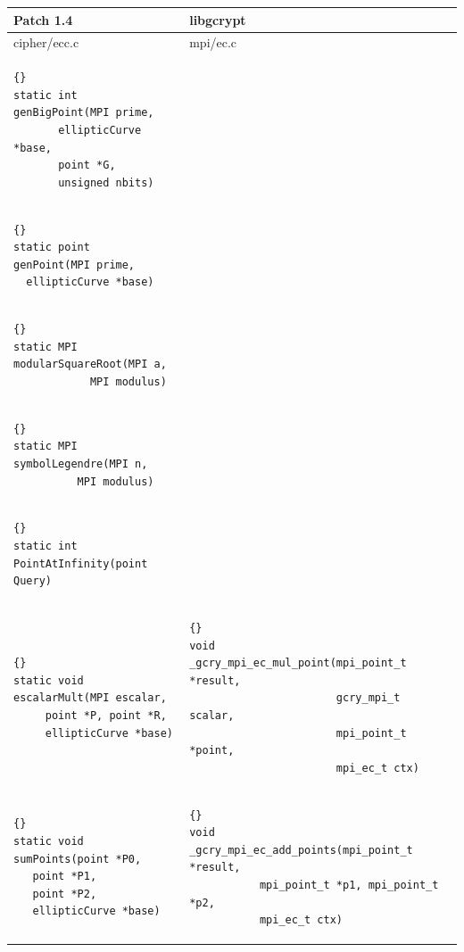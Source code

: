 \documentclass[12pt,twoside,catalan,a4paper]{book}%
\numberwithin{figure}{section}		%
\theoremstyle{definition}   			%
\theoremstyle{saltolinea}   			%
\begin{document}
\begin{table}
\begin{center}
\begin{tabular}{|l|l|}
\hline
Patch 1.4 & libgcrypt \\
\hline
 {\sf cipher/ecc.c}     & {\sf mpi/ec.c} \\
\hline
 {\tt \begin{lstlisting}{}
static int
genBigPoint(MPI prime,
       ellipticCurve *base,
       point *G,
       unsigned nbits)
      \end{lstlisting} }
 & \\
\hline
 {\tt \begin{lstlisting}{}
static point
genPoint(MPI prime,
  ellipticCurve *base)
      \end{lstlisting} }
 & \\
\hline
 {\tt \begin{lstlisting}{}
static MPI
modularSquareRoot(MPI a,
            MPI modulus)
      \end{lstlisting} }
 & \\
\hline
 {\tt \begin{lstlisting}{}
static MPI
symbolLegendre(MPI n,
          MPI modulus)
      \end{lstlisting} }
 & \\
\hline
 {\tt \begin{lstlisting}{}
static int
PointAtInfinity(point Query)
      \end{lstlisting} }
 & \\
\hline
 {\tt \begin{lstlisting}{}
static void
escalarMult(MPI escalar,
     point *P, point *R,
     ellipticCurve *base)
      \end{lstlisting} }
 &
 {\tt \begin{lstlisting}{}
void
_gcry_mpi_ec_mul_point(mpi_point_t *result,
                       gcry_mpi_t scalar,
                       mpi_point_t *point,
                       mpi_ec_t ctx)
      \end{lstlisting} }
 \\
\hline
 {\tt \begin{lstlisting}{}
static void
sumPoints(point *P0,
   point *P1,
   point *P2,
   ellipticCurve *base)
      \end{lstlisting} }
 &
 {\tt \begin{lstlisting}{}
void
_gcry_mpi_ec_add_points(mpi_point_t *result,
           mpi_point_t *p1, mpi_point_t *p2,
           mpi_ec_t ctx)
      \end{lstlisting} }

\end{tabular}
\end{center}
\end{table}
\end{document}
